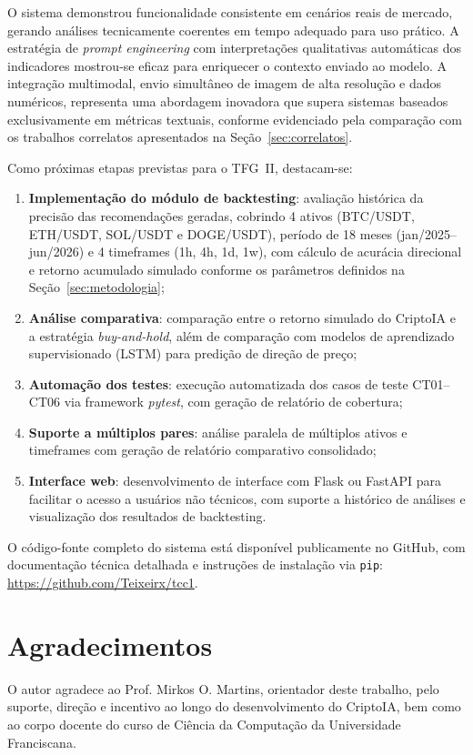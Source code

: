 \documentclass[conference]{IEEEtran}
\begin{document}
O sistema demonstrou funcionalidade consistente em cenários reais de mercado, gerando análises tecnicamente coerentes em tempo adequado para uso prático. A estratégia de \textit{prompt engineering} com interpretações qualitativas automáticas dos indicadores mostrou-se eficaz para enriquecer o contexto enviado ao modelo. A integração multimodal, envio simultâneo de imagem de alta resolução e dados numéricos, representa uma abordagem inovadora que supera sistemas baseados exclusivamente em métricas textuais, conforme evidenciado pela comparação com os trabalhos correlatos apresentados na Seção~\ref{sec:correlatos}.

Como próximas etapas previstas para o TFG~II, destacam-se:
\begin{enumerate}
  \item \textbf{Implementação do módulo de backtesting}: avaliação histórica da precisão das recomendações geradas, cobrindo 4 ativos (BTC/USDT, ETH/USDT, SOL/USDT e DOGE/USDT), período de 18 meses (jan/2025--jun/2026) e 4 timeframes (1h, 4h, 1d, 1w), com cálculo de acurácia direcional e retorno acumulado simulado conforme os parâmetros definidos na Seção~\ref{sec:metodologia};
  \item \textbf{Análise comparativa}: comparação entre o retorno simulado do CriptoIA e a estratégia \textit{buy-and-hold}, além de comparação com modelos de aprendizado supervisionado (LSTM) para predição de direção de preço;
  \item \textbf{Automação dos testes}: execução automatizada dos casos de teste CT01--CT06 via framework \textit{pytest}, com geração de relatório de cobertura;
  \item \textbf{Suporte a múltiplos pares}: análise paralela de múltiplos ativos e timeframes com geração de relatório comparativo consolidado;
  \item \textbf{Interface web}: desenvolvimento de interface com Flask ou FastAPI para facilitar o acesso a usuários não técnicos, com suporte a histórico de análises e visualização dos resultados de backtesting.
\end{enumerate}

O código-fonte completo do sistema está disponível publicamente no GitHub, com documentação técnica detalhada e instruções de instalação via \texttt{pip}: \url{https://github.com/Teixeirx/tcc1}.


\section*{Agradecimentos}
O autor agradece ao Prof.  Mirkos O. Martins, orientador deste trabalho, pelo suporte, direção e incentivo ao longo do desenvolvimento do CriptoIA, bem como ao corpo docente do curso de Ciência da Computação da Universidade Franciscana.
\end{document}

